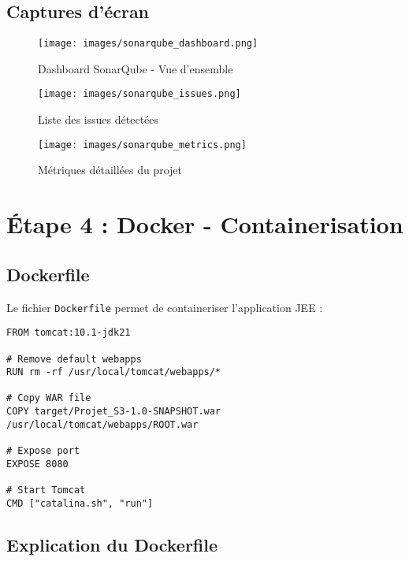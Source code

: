 \documentclass[12pt,a4paper]{article}
\begin{document}
\subsection{Captures d'écran}

\begin{figure}[H]
    \centering
    \texttt{[image: images/sonarqube\_dashboard.png]}
    \caption{Dashboard SonarQube - Vue d'ensemble}
    \label{fig:sonar_dashboard}
\end{figure}

\begin{figure}[H]
    \centering
    \texttt{[image: images/sonarqube\_issues.png]}
    \caption{Liste des issues détectées}
    \label{fig:sonar_issues}
\end{figure}

\begin{figure}[H]
    \centering
    \texttt{[image: images/sonarqube\_metrics.png]}
    \caption{Métriques détaillées du projet}
    \label{fig:sonar_metrics}
\end{figure}

\newpage

\section{Étape 4 : Docker - Containerisation}

\subsection{Dockerfile}

Le fichier \texttt{Dockerfile} permet de containeriser l'application JEE :

\begin{lstlisting}[language=docker]
FROM tomcat:10.1-jdk21

# Remove default webapps
RUN rm -rf /usr/local/tomcat/webapps/*

# Copy WAR file
COPY target/Projet_S3-1.0-SNAPSHOT.war /usr/local/tomcat/webapps/ROOT.war

# Expose port
EXPOSE 8080

# Start Tomcat
CMD ["catalina.sh", "run"]
\end{lstlisting}

\subsection{Explication du Dockerfile}
\end{document}

